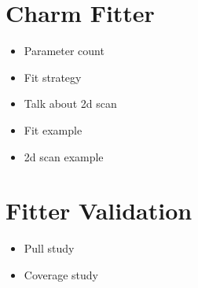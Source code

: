 \documentclass[note.tex]{subfiles}
\begin{document}
\section{Charm Fitter}
\begin{itemize}
    \item Parameter count
    \item Fit strategy
    \item Talk about 2d scan
    \item Fit example
    \item 2d scan example
\end{itemize}

\section{Fitter Validation}
\begin{itemize}
    \item Pull study
    \item Coverage study
\end{itemize}
\end{document}
